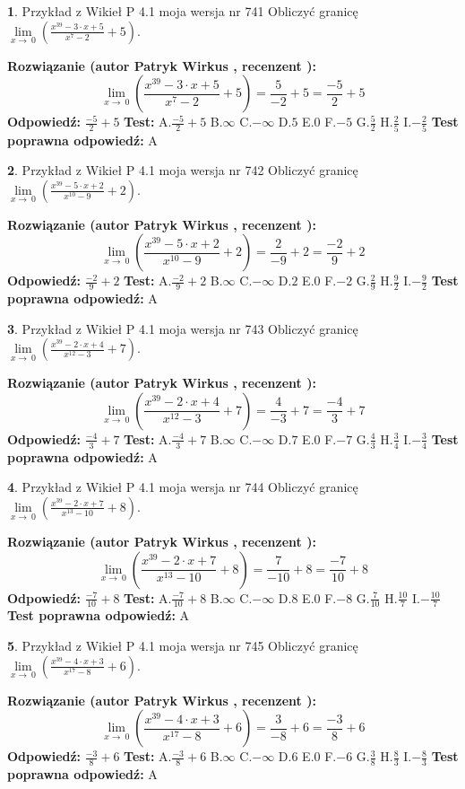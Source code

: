 \documentclass[12pt, a4paper]{article}
\theoremstyle{definition} %
\newtheorem{zad}{}
\newcommand{\zadStart}[1]{\begin{zad}#1\newline}
\newcommand{\zadStop}{\end{zad}}
\newcommand{\rozwStart}[2]{\noindent \textbf{Rozwiązanie (autor #1 , recenzent #2): }\newline}
\newcommand{\rozwStop}{\newline}
\newcommand{\odpStart}{\noindent \textbf{Odpowiedź:}\newline}
\newcommand{\odpStop}{\newline}
\newcommand{\testStart}{\noindent \textbf{Test:}\newline}
\newcommand{\testStop}{\newline}
\newcommand{\kluczStart}{\noindent \textbf{Test poprawna odpowiedź:}\newline}
\newcommand{\kluczStop}{\newline}
\begin{document}
\zadStart{Przykład z Wikieł P 4.1 moja wersja nr 741}
Obliczyć granicę $\lim\limits_{x\to\ 0}(\frac{x^{39}-3 \cdot x +5}{x^{7}-2}+5)$.
\zadStop
\rozwStart{Patryk Wirkus}{}
$$\lim\limits_{x\to\ 0}(\frac{x^{39}-3 \cdot x +5}{x^{7}-2}+5)=\frac{5}{-2}+5=\frac{-5}{2}+5$$
\rozwStop
\odpStart
$\frac{-5}{2}+5$
\odpStop
\testStart
A.$\frac{-5}{2}+5$
B.$\infty$
C.$-\infty$
D.$5$
E.$0$
F.$-5$
G.$\frac{5}{2}$
H.$\frac{2}{5}$
I.$-\frac{2}{5}$
\testStop
\kluczStart
A
\kluczStop



\zadStart{Przykład z Wikieł P 4.1 moja wersja nr 742}
Obliczyć granicę $\lim\limits_{x\to\ 0}(\frac{x^{39}-5 \cdot x +2}{x^{10}-9}+2)$.
\zadStop
\rozwStart{Patryk Wirkus}{}
$$\lim\limits_{x\to\ 0}(\frac{x^{39}-5 \cdot x +2}{x^{10}-9}+2)=\frac{2}{-9}+2=\frac{-2}{9}+2$$
\rozwStop
\odpStart
$\frac{-2}{9}+2$
\odpStop
\testStart
A.$\frac{-2}{9}+2$
B.$\infty$
C.$-\infty$
D.$2$
E.$0$
F.$-2$
G.$\frac{2}{9}$
H.$\frac{9}{2}$
I.$-\frac{9}{2}$
\testStop
\kluczStart
A
\kluczStop



\zadStart{Przykład z Wikieł P 4.1 moja wersja nr 743}
Obliczyć granicę $\lim\limits_{x\to\ 0}(\frac{x^{39}-2 \cdot x +4}{x^{12}-3}+7)$.
\zadStop
\rozwStart{Patryk Wirkus}{}
$$\lim\limits_{x\to\ 0}(\frac{x^{39}-2 \cdot x +4}{x^{12}-3}+7)=\frac{4}{-3}+7=\frac{-4}{3}+7$$
\rozwStop
\odpStart
$\frac{-4}{3}+7$
\odpStop
\testStart
A.$\frac{-4}{3}+7$
B.$\infty$
C.$-\infty$
D.$7$
E.$0$
F.$-7$
G.$\frac{4}{3}$
H.$\frac{3}{4}$
I.$-\frac{3}{4}$
\testStop
\kluczStart
A
\kluczStop



\zadStart{Przykład z Wikieł P 4.1 moja wersja nr 744}
Obliczyć granicę $\lim\limits_{x\to\ 0}(\frac{x^{39}-2 \cdot x +7}{x^{13}-10}+8)$.
\zadStop
\rozwStart{Patryk Wirkus}{}
$$\lim\limits_{x\to\ 0}(\frac{x^{39}-2 \cdot x +7}{x^{13}-10}+8)=\frac{7}{-10}+8=\frac{-7}{10}+8$$
\rozwStop
\odpStart
$\frac{-7}{10}+8$
\odpStop
\testStart
A.$\frac{-7}{10}+8$
B.$\infty$
C.$-\infty$
D.$8$
E.$0$
F.$-8$
G.$\frac{7}{10}$
H.$\frac{10}{7}$
I.$-\frac{10}{7}$
\testStop
\kluczStart
A
\kluczStop



\zadStart{Przykład z Wikieł P 4.1 moja wersja nr 745}
Obliczyć granicę $\lim\limits_{x\to\ 0}(\frac{x^{39}-4 \cdot x +3}{x^{17}-8}+6)$.
\zadStop
\rozwStart{Patryk Wirkus}{}
$$\lim\limits_{x\to\ 0}(\frac{x^{39}-4 \cdot x +3}{x^{17}-8}+6)=\frac{3}{-8}+6=\frac{-3}{8}+6$$
\rozwStop
\odpStart
$\frac{-3}{8}+6$
\odpStop
\testStart
A.$\frac{-3}{8}+6$
B.$\infty$
C.$-\infty$
D.$6$
E.$0$
F.$-6$
G.$\frac{3}{8}$
H.$\frac{8}{3}$
I.$-\frac{8}{3}$
\testStop
\kluczStart
A
\kluczStop
\end{document}
